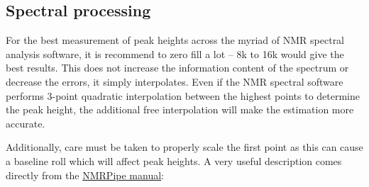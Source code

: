 \subsection{Spectral processing}

For the best measurement of peak heights across the myriad of NMR spectral analysis software, it is recommend to zero fill a lot -- 8k to 16k would give the best results.
This does not increase the information content of the spectrum or decrease the errors, it simply interpolates.
Even if the NMR spectral software performs 3-point quadratic interpolation between the highest points to determine the peak height, the additional free interpolation will make the estimation more accurate.

Additionally, care must be taken to properly scale the first point as this can cause a baseline roll which will affect peak heights.
A very useful description comes directly from the \href{http://spin.niddk.nih.gov/NMRPipe/doc1/}{NMRPipe manual}:

